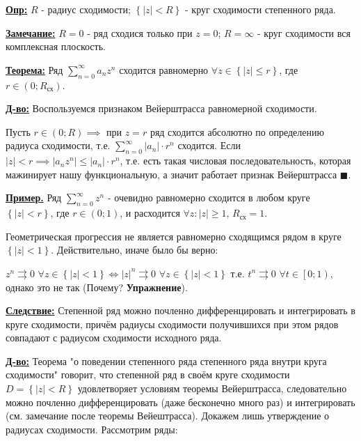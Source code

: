 \documentclass[a4paper, 12pt]{article}
\begin{document}
  \quad \textbf{\underline{Опр:}} $R$ - радиус сходимости; $\left\{ |z| < R \right\}$ - круг сходимости степенного ряда.

  \quad \textbf{\underline{Замечание:}} $R = 0$ - ряд сходися только при $z = 0$; $R = \infty$ - круг сходимости вся комплексная плоскость. 

  \quad \textbf{\underline{Теорема:}} Ряд $\sum\limits_{n=0}^{\infty} a_n z^n$ сходится равномерно $\forall z \in \left\{ |z| \leq r \right\}$, где $r \in (0; R_{\text{сх}})$. 

  \quad \textbf{\underline{Д-во:}} Воспользуемся признаком Вейерштрасса равномерной сходимости. 

  \quad Пусть $r \in (0; R) \implies $ при $z = r$ ряд сходится абсолютно по определению радиуса сходимости, т.е. $\displaystyle\sum\limits_{n=0}^{\infty} |a_n| \cdot r^n$ сходится. Если $|z| < r \implies |a_n z^n| \leq |a_n| \cdot r^n$, т.е. есть такая числовая последовательность, которая мажинирует нашу функциональную, а значит работает признак Вейерштрасса $\blacksquare$. 

  \quad \textbf{\underline{Пример.}} Ряд $\displaystyle\sum\limits_{n=0}^{\infty} z^n$ - очевидно равномерно сходится в любом круге $\left\{ |z| < r \right\}$, где $r \in (0; 1)$, и расходится $\forall z: |z| \geq 1$, $R_{\text{сх}} = 1$. 

  \quad Геометрическая прогрессия не является равномерно сходящимся рядом в круге $\left\{ |z| < 1 \right\}$. Действительно, иначе было бы верно:

  $ z^n \rightrightarrows 0 $ $\forall z \in \left\{ |z| < 1 \right\} \Leftrightarrow |z|^n \rightrightarrows 0$ $\forall z \in \left\{|z| <  1\right\} $ т.е. $t^n \rightrightarrows 0$ $\forall t \in \left[ 0; 1 \right)$, однако это не так (Почему? \textbf{Упражнение}). 

  \quad \textbf{\underline{Следствие:}} Степенной ряд можно почленно дифференцировать и интегрировать в круге сходимости, причём радиусы сходимости получившихся при этом рядов совпадают с радиусом сходимости исходного ряда. 

  \quad \textbf{\underline{Д-во:}} Теорема "о поведении степенного ряда степенного ряда внутри круга сходимости" говорит, что степенной ряд в своём круге сходимости $D = \left\{ |z| < R \right\}$ удовлетворяет условиям теоремы Вейерштрасса, следовательно можно почленно дифференцировать (даже бесконечно много раз) и интегрировать (см. замечание после теоремы Вейештрасса). Докажем лишь утверждение о радиусах сходимости. 
  \quad Рассмотрим ряды: 
\end{document}
